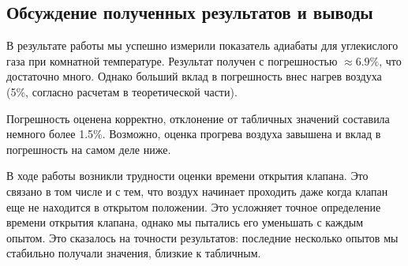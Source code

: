 \documentclass[a4paper,12pt]{report}
\begin{document}
    \begin{multicols}{2}
    \section{Обсуждение полученных результатов и выводы}
    
    В результате работы мы успешно измерили показатель адиабаты для углекислого газа при комнатной температуре. Результат получен с погрешностью $\approx 6.9\%$, что достаточно много. Однако больший вклад в погрешность внес нагрев воздуха (5\%, согласно расчетам в теоретической части).

    Погрешность оценена корректно, отклонение от табличных значений составила немного более 1.5\%. Возможно, оценка прогрева воздуха завышена и вклад в погрешность на самом деле ниже.

    В ходе работы возникли трудности оценки времени открытия клапана. Это связано в том числе и с тем, что воздух начинает проходить даже когда клапан еще не находится в открытом положении. Это усложняет точное определение времени открытия клапана, однако мы пытались его уменьшать с каждым опытом. Это сказалось на точности результатов: последние несколько опытов мы стабильно получали значения, близкие к табличным.
    \end{multicols}
\end{document}
